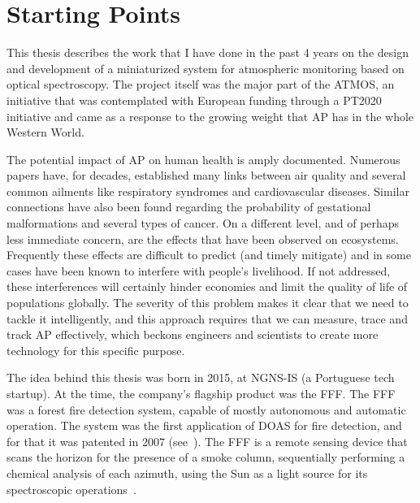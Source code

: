 
\section{Starting Points}%
\label{sec:intro_starting_points}

This thesis describes the work that I have done in the past 4 years on
the design and development of a miniaturized system for atmospheric
monitoring based on optical spectroscopy. The project itself was the
major part of the \gls{ATMOS}, an initiative that was
contemplated with European funding through a \gls{PT2020} initiative and
came as a response to the growing weight that \gls{AP} has in the whole
Western World.

The potential impact of \gls{AP} on human health is amply documented.
Numerous papers have, for decades, established many links between air
quality and several common ailments like respiratory syndromes and
cardiovascular diseases. Similar connections have also been found
regarding the probability of gestational malformations and several types
of cancer. On a different level, and of perhaps less immediate concern,
are the effects that have been observed on ecosystems. Frequently these
effects are difficult to predict (and timely mitigate) and in some cases
have been known to interfere with people's livelihood. If not addressed,
these interferences will certainly hinder economies and limit the
quality of life of populations globally. The severity of this problem
makes it clear that we need to tackle it intelligently, and this
approach requires that we can measure, trace and track \gls{AP}
effectively, which beckons engineers and scientists to create more
technology for this specific purpose.


The idea behind this thesis was born in 2015, at NGNS-IS (a Portuguese
tech startup). At the time, the company's flagship product was the
\gls{FFF}. The \gls{FFF} was a forest fire detection system, capable of
mostly autonomous and automatic operation.  The system was the first
application of \gls{DOAS} for fire detection, and for that it was
patented in 2007 (see~\cite{Vieira2007, Application2008}). The \gls{FFF}
is a remote sensing device that scans the horizon for the presence of a
smoke column, sequentially performing a chemical analysis of each
azimuth, using the Sun as a light source for its spectroscopic
operations~\cite{ValentedeAlmeida2017}.

